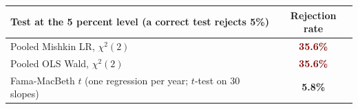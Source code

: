 \begin{tabular}{@{}lc@{}}
\toprule
Test at the 5 percent level (a correct test rejects 5\%) & Rejection rate \\
\midrule
Pooled Mishkin LR, $\chi^2(2)$ & \textcolor{Maroon}{\bfseries 35.6\%} \\
Pooled OLS Wald, $\chi^2(2)$ & \textcolor{Maroon}{\bfseries 35.6\%} \\
Fama-MacBeth $t$ (one regression per year; $t$-test on 30 slopes) & \textcolor{DeepNavy}{\bfseries 5.8\%} \\
\bottomrule
\end{tabular}
